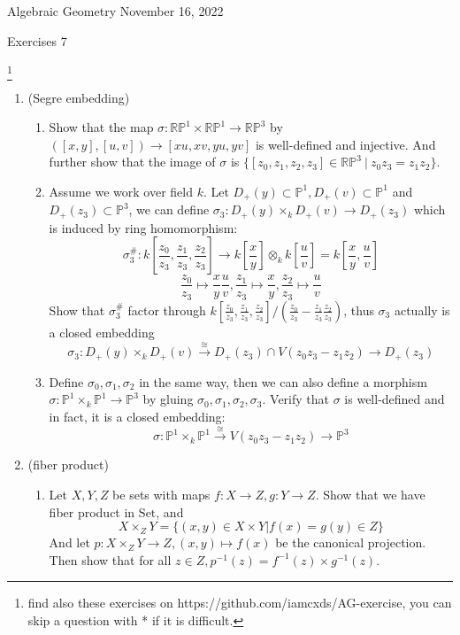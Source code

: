 \documentclass[a4paper,11pt]{article}
\def\bb#1{\mathbb{#1}}
\begin{document}
{\small Algebraic Geometry \hfill November 16, 2022 \\}
\begin{center}
\Huge Exercises 7
\end{center}

\vskip0.6cm
\footnote{find also these exercises on https://github.com/iamcxds/AG-exercise, you can skip a question with * if it is difficult.}

\begin{enumerate}[1.]
\item(Segre embedding) 
\begin{enumerate}
    \item Show that the map $\sigma:\bb{RP}^1\times\bb{RP}^1\to \bb{RP}^3$ by $([x,y],[u,v])\to[xu,xv,yu,yv]$ is well-defined and injective. And further show that the image of $\sigma$ is $\{[z_0,z_1,z_2,z_3]\in\bb{RP}^3\ |\  z_0z_3=z_1z_2\}$.
    \item Assume we work over field $k$.
    Let $D_+(y)\subset\bb{P}^1, D_+(v)\subset\bb{P}^1$ and $D_+(z_3)\subset\bb{P}^3$, we can define $\sigma_3: D_+(y)\times_k D_+(v) \to D_+(z_3)$ which is induced by ring homomorphism:
    \[ \sigma_3^\#: k[\frac{z_0}{z_3},\frac{z_1}{z_3},\frac{z_2}{z_3}] \to k[\frac{x}{y}]\otimes_k k[\frac{u}{v}]=k[\frac{x}{y},\frac{u}{v}]\]
    \[ \frac{z_0}{z_3}\mapsto \frac{x}{y}\frac{u}{v}, 
     \frac{z_1}{z_3}\mapsto \frac{x}{y}, 
     \frac{z_2}{z_3}\mapsto \frac{u}{v} \]
    Show that $\sigma_3^\#$ factor through 
    $k[\frac{z_0}{z_3},\frac{z_1}{z_3},\frac{z_2}{z_3}]/(\frac{z_0}{z_3}-\frac{z_1}{z_3}\frac{z_2}{z_3})$, 
    thus $\sigma_3$ actually is a closed embedding 
    \[\sigma_3: D_+(y)\times_k D_+(v)\xrightarrow{\cong} D_+(z_3)\cap V(z_0z_3-z_1z_2) \to D_+(z_3)\]
    \item Define $\sigma_0,\sigma_1,\sigma_2$ in the same way,
    then we can also define a morphism $\sigma:\bb{P}^1\times_k \bb{P}^1\to \bb{P}^3$ by gluing  $\sigma_0,\sigma_1,\sigma_2,\sigma_3$. Verify that $\sigma$ is well-defined and in fact, it is a closed embedding:
    \[\sigma:\bb{P}^1\times_k \bb{P}^1\xrightarrow{\cong}V(z_0z_3-z_1z_2)\to \bb{P}^3\]
\end{enumerate}
\item (fiber product)
\begin{enumerate}
    \item Let $X,Y,Z$ be sets with maps $f:X\to Z,g:Y\to Z$. Show that we have fiber product in $\mathrm{Set}$, and
    \[X \times_Z Y=\{(x,y)\in X \times Y | f(x)=g(y)\in Z \}\]
    And let $p:X \times_Z Y\to Z, (x,y)\mapsto f(x)$ be the canonical projection. Then show that for all $z\in Z, p^{-1}(z)=f^{-1}(z)\times g^{-1}(z)$. 

\end{enumerate}
\end{enumerate}
\end{document}
